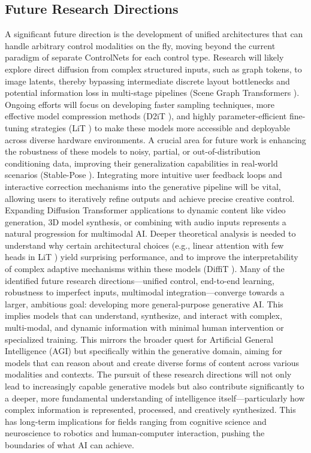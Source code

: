 \documentclass[a4paper]{article}
\begin{document}
\subsection{Future Research Directions}
A significant future direction is the development of unified architectures that can handle arbitrary control modalities on the fly, moving beyond the current paradigm of separate ControlNets \cite{Zhang2023ControlNet} for each control type. Research will likely explore direct diffusion from complex structured inputs, such as graph tokens, to image latents, thereby bypassing intermediate discrete layout bottlenecks and potential information loss in multi-stage pipelines (Scene Graph Transformers \cite{Sortino2023TransformerSceneGraphs}). Ongoing efforts will focus on developing faster sampling techniques, more effective model compression methods (D2iT \cite{Jia2025D2iT}), and highly parameter-efficient fine-tuning strategies (LiT \cite{Jiang2025LiT}) to make these models more accessible and deployable across diverse hardware environments. A crucial area for future work is enhancing the robustness of these models to noisy, partial, or out-of-distribution conditioning data, improving their generalization capabilities in real-world scenarios (Stable-Pose \cite{Wang2024StablePose}). Integrating more intuitive user feedback loops and interactive correction mechanisms into the generative pipeline will be vital, allowing users to iteratively refine outputs and achieve precise creative control. Expanding Diffusion Transformer applications to dynamic content like video generation, 3D model synthesis, or combining with audio inputs represents a natural progression for multimodal AI. Deeper theoretical analysis is needed to understand why certain architectural choices (e.g., linear attention with few heads in LiT \cite{Jiang2025LiT}) yield surprising performance, and to improve the interpretability of complex adaptive mechanisms within these models (DiffiT \cite{Hatamizadeh2023DiffiT}). Many of the identified future research directions—unified control, end-to-end learning, robustness to imperfect inputs, multimodal integration—converge towards a larger, ambitious goal: developing more general-purpose generative AI. This implies models that can understand, synthesize, and interact with complex, multi-modal, and dynamic information with minimal human intervention or specialized training. This mirrors the broader quest for Artificial General Intelligence (AGI) but specifically within the generative domain, aiming for models that can reason about and create diverse forms of content across various modalities and contexts. The pursuit of these research directions will not only lead to increasingly capable generative models but also contribute significantly to a deeper, more fundamental understanding of intelligence itself—particularly how complex information is represented, processed, and creatively synthesized. This has long-term implications for fields ranging from cognitive science and neuroscience to robotics and human-computer interaction, pushing the boundaries of what AI can achieve.
\end{document}
